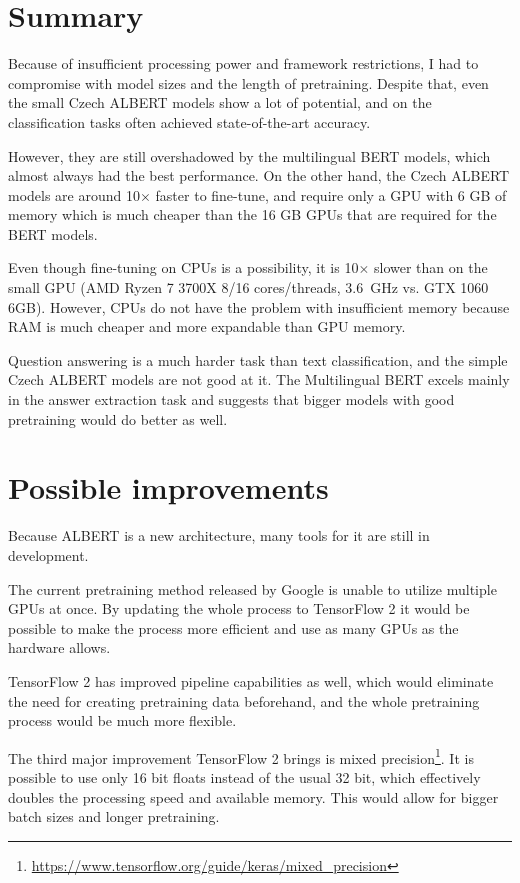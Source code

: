 \documentclass[
  printed, %
  color,   %
  table,   %
  oneside, %
  lof,     %
  lot,     %
]{fithesis3}
\begin{document}

\section{Summary}

Because of insufficient processing power and framework restrictions, I had to compromise with model sizes and the length of pretraining. Despite that, even the small Czech ALBERT models show a lot of potential, and on the classification tasks often achieved state-of-the-art accuracy.

However, they are still overshadowed by the multilingual BERT models, which almost always had the best performance. On the other hand, the Czech ALBERT models are around 10$\times$ faster to fine-tune, and require only a GPU with 6 GB of memory which is much cheaper than the 16 GB GPUs that are required for the BERT models.

Even though fine-tuning on CPUs is a possibility, it is 10$\times$ slower than on the small GPU (AMD Ryzen 7 3700X 8/16 cores/threads, 3.6~GHz vs. GTX 1060 6GB). However, CPUs do not have the problem with insufficient memory because RAM is much cheaper and more expandable than GPU memory.

Question answering is a much harder task than text classification, and the simple Czech ALBERT models are not good at it. The Multilingual BERT excels mainly in the answer extraction task and suggests that bigger models with good pretraining would do better as well.

\section{Possible improvements}
 Because ALBERT is a new architecture, many tools for it are still in development.

The current pretraining method released by Google is unable to utilize multiple GPUs at once. By updating the whole process to TensorFlow 2 it would be possible to make the process more efficient and use as many GPUs as the hardware allows.

TensorFlow 2 has improved pipeline capabilities as well, which would eliminate the need for creating pretraining data beforehand, and the whole pretraining process would be much more flexible.

The third major improvement TensorFlow 2 brings is mixed precision\footnote{\url{https://www.tensorflow.org/guide/keras/mixed_precision}}. It is possible to use only 16 bit floats instead of the usual 32 bit, which effectively doubles the processing speed and available memory. This would allow for bigger batch sizes and longer pretraining. 
\end{document}
